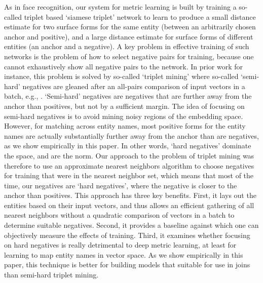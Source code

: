 As in face recognition, our system for metric learning is built by training a so-called triplet based `siamese triplet' network to learn to produce a small distance estimate for two surface forms for the same entity (between an arbitrarily chosen anchor and positive), and a large distance estimate for surface forms of different entities (an anchor and a negative).  A key problem in effective training of such networks is the problem of how to select negative pairs for training, because one cannot exhaustively show all negative pairs to the network.  In prior work for instance, this problem is solved by so-called `triplet mining' where so-called `semi-hard' negatives are gleaned after an all-pairs comparison of input vectors in a batch, e.g., \cite{DBLP:conf/cvpr/SchroffKP15}.  `Semi-hard' negatives are negatives that are further away from the anchor than positives, but not by a sufficient margin.  The idea of focusing on semi-hard negatives is to avoid mining noisy regions of the embedding space.  However, for matching across entity names, most positive forms for the entity names are actually substantially further away from the anchor than are negatives, as we show empirically in this paper.  In other words, `hard negatives' dominate the space, and are the norm.  Our approach to the problem of triplet mining was therefore to use an approximate nearest neighbors algorithm to choose negatives for training that were in the nearest neighbor set, which means that most of the time, our negatives are `hard negatives', where the negative is closer to the anchor than positives.  This approach has three key benefits.  First, it lays out the entities based on their input vectors, and thus allows an efficient gathering of all nearest neighbors without a quadratic comparison of vectors in a batch to determine suitable negatives.  Second, it provides a baseline against which one can objectively measure the effects of training.  Third, it examines whether focusing on hard negatives is really detrimental to deep metric learning, at least for learning to map entity names in vector space.  As we show empirically in this paper, this technique is better for building models that suitable for use in joins than semi-hard triplet mining.

